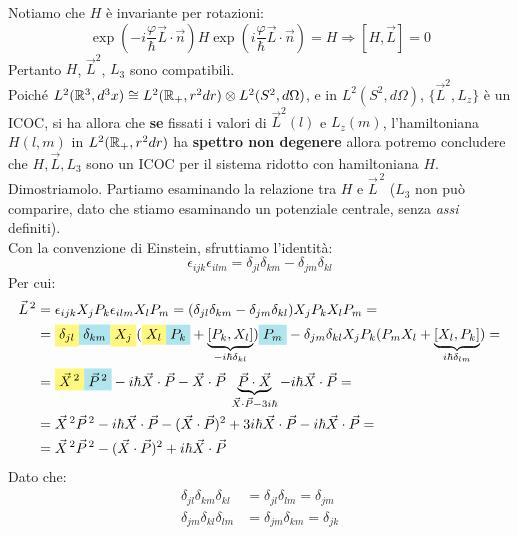 \documentclass[../../FisicaTeorica.tex]{subfiles}
\begin{document}
Notiamo che $H$ è invariante per rotazioni:
\[
\exp\left(-i\frac{\varphi}{\hbar}\vec{L}\cdot\vec{n}\right) H \exp\left(i\frac{\varphi}{\hbar}\vec{L}\cdot \vec{n}\right) = H \Rightarrow [H, \vec{L}]=0
\]
Pertanto $H$, $\vec{L}^2$, $L_3$ sono compatibili.\\
Poiché $L^2(\mathbb{R}^3,d^3x) \cong L^2(\mathbb{R}_+, r^2 dr) \otimes L^2(S^2, d\Omega)$, e in $L^2(S^2, d\Omega)$, $\{\vec{L}^2, L_z\}$ è un ICOC, si ha allora che \textbf{se} fissati i valori di $\vec{L}^2(l)$ e $L_z(m)$, l'hamiltoniana $H(l,m)$ in $L^2(\mathbb{R}_+, r^2 dr)$ ha \textbf{spettro non degenere} allora potremo concludere che $H,\vec{L},L_3$ sono un ICOC per il sistema ridotto con hamiltoniana $H$.\\
Dimostriamolo. Partiamo esaminando la relazione tra $H$ e $\vec{L}^{\,2}$ ($L_3$ non può comparire, dato che stiamo esaminando un potenziale centrale, senza \textit{assi} definiti).\\
Con la convenzione di Einstein, sfruttiamo l'identità:
\[
\epsilon_{ijk}\epsilon_{ilm}=\delta_{jl}\delta_{km}-\delta_{jm}\delta_{kl}
\]
Per cui:
\begin{align*}
\vec{L}^{\,2} &= \epsilon_{ijk}X_j P_k \epsilon_{ilm} X_l P_m = (\delta_{jl}\delta_{km}-\delta_{jm}\delta_{kl})X_j P_k X_l P_m =\\
&= \hlc{Yellow}{\delta_{jl}}\hlc{SkyBlue}{\delta_{km}}\hlc{Yellow}{X_j}(\hlc{Yellow}{X_l }\hlc{SkyBlue}{P_k} + \underbrace{[P_k, X_l]}_{-i\hbar\delta_{kl}})\hlc{SkyBlue}{P_m} - \delta_{jm}\delta_{kl} X_j P_k (P_m X_l + \underbrace{[X_l, P_k]}_{i\hbar \delta_{lm}}) =\\
&= \hlc{Yellow}{\vec{X}^{\,2}}\hlc{SkyBlue}{\vec{P}^{\,2}} - i\hbar \vec{X}\cdot \vec{P} - \vec{X}\cdot\vec{P}\> \underbrace{\vec{P}\cdot \vec{X}}_{\vec{X}\cdot \vec{P}-3i\hbar} -i\hbar \vec{X}\cdot\vec{P}=\\
&=\vec{X}^{\,2}\vec{P}^{\,2} - i\hbar \vec{X}\cdot\vec{P} - (\vec{X}\cdot \vec{P})^2+3i\hbar \vec{X}\cdot\vec{P}-i\hbar \vec{X}\cdot\vec{P}=\\
&=\vec{X}^{\,2}\vec{P}^{\,2}-(\vec{X}\cdot\vec{P})^2 + i\hbar \vec{X}\cdot\vec{P}
\end{align*}
Dato che:
\begin{align*}
\delta_{jl}\delta_{km}\delta_{kl}&=\delta_{jl}\delta_{lm}=\delta_{jm}\\
\delta_{jm}\delta_{kl}\delta_{lm}&=\delta_{jm}\delta_{km} = \delta_{jk}
\end{align*}
\end{document}
